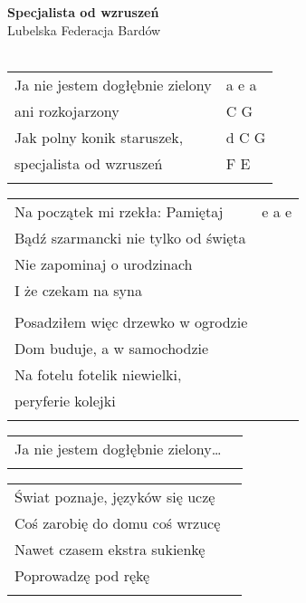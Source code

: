 \documentclass[a5paper]{article}
\begin{document}


\noindent
\fontsize{12pt}{15pt}\selectfont
\textbf{Specjalista od wzruszeń} \\
\fontsize{8pt}{10pt}\selectfont
Lubelska Federacja Bardów \\ \\
\fontsize{10pt}{12pt}\selectfont

\begin{tabular}{@{}p{6.50cm}p{3cm}@{}}
\noindent
Ja nie jestem dogłębnie zielony & a e a \\
ani rozkojarzony & C G \\
Jak polny konik staruszek, & d C G \\
specjalista od wzruszeń & F E \\ \\
\end{tabular}

\noindent
\begin{tabular}{@{}p{7.50cm}p{3cm}@{}}
Na początek mi rzekła: Pamiętaj & e a e \\
Bądź szarmancki nie tylko od święta \\
Nie zapominaj o urodzinach \\
I że czekam na syna \\ \\
Posadziłem więc drzewko w ogrodzie \\
Dom buduje, a w samochodzie \\
Na fotelu fotelik niewielki, \\
peryferie kolejki \\ \\
\end{tabular}

\noindent
\begin{tabular}{@{}p{6.50cm}p{3cm}@{}}
Ja nie jestem dogłębnie zielony… \\ \\
\end{tabular}

\noindent
\begin{tabular}{@{}p{7.50cm}p{3cm}@{}}
Świat poznaje, języków się uczę \\
Coś zarobię do domu coś wrzucę \\
Nawet czasem ekstra sukienkę \\
Poprowadzę pod rękę \\ \\
\end{tabular}
\end{document}
